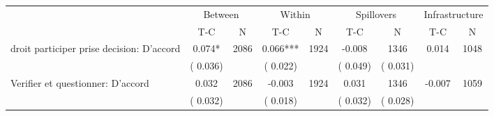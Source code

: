
\begin{tabular}{l*{8}{c}}\hline&\multicolumn{2}{c}{Between}&\multicolumn{2}{c}{Within}&\multicolumn{2}{c}{Spillovers}&\multicolumn{2}{c}{Infrastructure}\\ \cmidrule(r){2-3}\cmidrule(l){4-5}\cmidrule(l){6-7}\cmidrule(l){8-9} & {T-C} & {N} & {T-C} & {N}  & {T-C}  & {N} & {T-C}  & {N} \\ \midrule
droit participer prise decision: D'accord        &              0.074*      &       2086       &              0.066***      &       1924       &             -0.008      &       1346  &        0.014 &       1048       \\
                       &       (       0.036)            &                               &       (       0.022)            &                               &       (       0.049)            &       (       0.031) &                  \\
Verifier et questionner: D'accord        &              0.032      &       2086       &             -0.003      &       1924       &              0.031      &       1346  &       -0.007 &       1059       \\
                       &       (       0.032)            &                               &       (       0.018)            &                               &       (       0.032)            &       (       0.028) &                  \\
\hline \end{tabular}